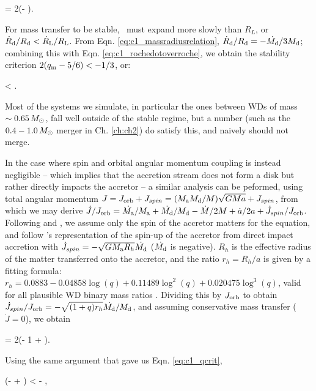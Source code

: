 \eqbegin
{} = 2(\qm- )\frac{\dot{\Md}}{\Md}.
\label{eq:c1_rochedotoverroche}
\eqend

\noindent For mass transfer to be stable, \Rd\ must expand more slowly than $R_L$, or $\dot{R}_\mrm{d}/\Rd < \dot{R}_\mrm{L}/R_\mrm{L}$.  From Eqn. \ref{eq:c1_massradiusrelation}, $\dot{R}_\mrm{d}/\Rd = -\dot{\Md}/3\Md$; combining this with Eqn. \ref{eq:c1_rochedotoverroche}, we obtain the stability criterion $2(\qm- 5/6) < -1/3$, or:

\eqbegin
\qm < .
\label{eq:c1_qcrit}
\eqend

\noindent Most of the systems we simulate, in particular the ones between WDs of mass $\sim0.65\,\Msun$, fall well outside of the stable regime, but a number (such as the $0.4 - 1.0\,\Msun$ merger in Ch. \ref{ch:ch2}) do satisfy this, and naively should not merge.

In the case where spin and orbital angular momentum coupling is instead negligible -- which implies that the accretion stream does not form a disk but rather directly impacts the accretor \citep{nele+01} -- a similar analysis can be peformed, using total angular momentum $J = J_\mrm{orb} + J_{spin} = (\Ma\Md/M)\sqrt{GMa} + J_{spin}$, from which we may derive $\dot{J}/J_\mrm{orb} = \dot{\Ma}/\Ma + \dot{\Md}/\Md - \dot{M}/2M + \dot{a}/2a + \dot{J}_{spin}/J_\mrm{orb}$.  Following \cite{marsns04} and \cite{nele+01}, we assume only the spin of the accretor matters for the equation, and follow \cite{verbr88}'s representation of the spin-up of the accretor from direct impact accretion with $\dot{J}_{spin} = -\sqrt{G\Ma R_h}\dot{\Md}$ ($\dot{\Md}$ is negative).  $R_h$ is the effective radius of the matter transferred onto the accretor, and the ratio $r_h = R_h/a$ is given by a fitting formula: $r_h = 0.0883 - 0.04858\log({q}) + 0.11489{\log}^2(q) + 0.020475{\log}^3(q)$, valid for all plausible WD binary mass ratios \citep{verbr88}.  Dividing this by $J_\mathrm{orb}$ to obtain $\dot{J}_{spin}/J_\mrm{orb} = -\sqrt{(1 + q)r_h}\dot{\Md}/\Md$, and assuming conservative mass transfer ($\dot{J} = 0$), we obtain \citep{marsns04,nele+01}

\eqbegin
{} = 2\left(\qm- 1 + \right)\frac{\dot{\Md}}{\Md}.
\label{eq:c1_adotovera2}
\eqend

\noindent Using the same argument that gave us Eqn. \ref{eq:c1_qcrit},

\left(\qm-  + \right) < - ,
\label{eq:c1_qcrit2}
\eqend

